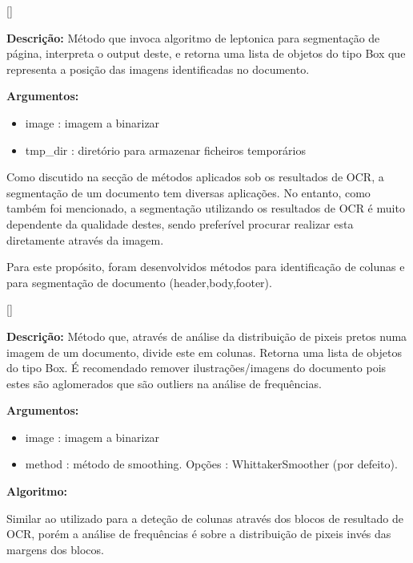 
[\normalsize]

\textbf{Descrição:} Método que invoca algoritmo de leptonica para segmentação de página, interpreta o output deste, e retorna uma lista de objetos do tipo Box que representa a posição das imagens identificadas no documento.


\textbf{Argumentos:}
\begin{itemize}\setlength\itemsep{-0.3em}
	\item image : imagem a binarizar
	\item tmp\_dir : diretório para armazenar ficheiros temporários
\end{itemize}


\label{contribution_image_segmentation}

Como discutido na secção de métodos aplicados sob os resultados de OCR, a segmentação de um documento tem diversas aplicações. No entanto, como também foi mencionado, a segmentação utilizando os resultados de OCR é muito dependente da qualidade destes, sendo preferível procurar realizar esta diretamente através da imagem.

Para este propósito, foram desenvolvidos métodos para identificação de colunas e para segmentação de documento (header,body,footer).

[\normalsize]

\textbf{Descrição:} Método que, através de análise da distribuição de pixeis pretos numa imagem de um documento, divide este em colunas. Retorna uma lista de objetos do tipo Box.
É recomendado remover ilustrações/imagens do documento pois estes são aglomerados que são outliers na análise de frequências.

\textbf{Argumentos:}
\begin{itemize}\setlength\itemsep{-0.3em}
	\item image : imagem a binarizar
	\item method : método de smoothing. Opções : WhittakerSmoother (por defeito).
\end{itemize}

\textbf{Algoritmo:} 

Similar ao utilizado para a deteção de colunas através dos blocos de resultado de OCR, porém a análise de frequências é sobre a distribuição de pixeis invés das margens dos blocos.




